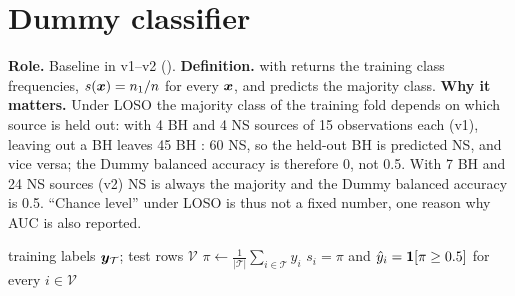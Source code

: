 \section{Dummy classifier}\label{sec:dummy}
\textbf{Role.} Baseline in v1--v2 (). \textbf{Definition.}  with 
returns the training class frequencies, $s(\bm{x})=n_1/n$ for every $\bm{x}$, and predicts the majority class. \textbf{Why it
matters.} Under LOSO the majority class of the training fold depends on which source is held out: with 4 BH and 4 NS
sources of 15 observations each (v1), leaving out a BH leaves 45 BH : 60 NS, so the held-out BH is predicted NS, and vice
versa; the Dummy balanced accuracy is therefore 0, not 0.5. With 7 BH and 24 NS sources (v2) NS is always the majority
and the Dummy balanced accuracy is 0.5. ``Chance level'' under LOSO is thus not a fixed number, one reason why AUC is
also reported.

\begin{algorithm}[htbp]
\caption{Dummy (prior) classifier}\label{alg:dummy}
\begin{algorithmic}[1]
\Require training labels $\bm{y}_\mathcal T$; test rows $\mathcal V$
\State $\pi\gets\frac{1}{|\mathcal T|}\sum_{i\in\mathcal T}y_i$ 
\State \Return $s_i=\pi$ and $\hat y_i=\mathbf{1}\!\left[\pi\ge0.5\right]$ for every $i\in\mathcal V$
\end{algorithmic}
\end{algorithm}


